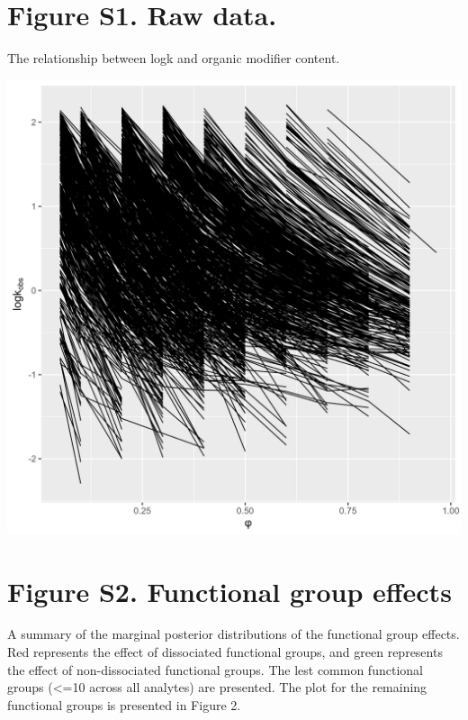 \documentclass[
]{article}
\begin{document}
\newpage{}

\hypertarget{figure-s1.-raw-data.}{%
\section{Figure S1. Raw data.}\label{figure-s1.-raw-data.}}

The relationship between logk and organic modifier content.

\includegraphics{../deliv/figures/manuscript/supplement/raw-data.png}

\newpage{}

\hypertarget{figure-s2.-functional-group-effects}{%
\section{Figure S2. Functional group
effects}\label{figure-s2.-functional-group-effects}}

A summary of the marginal posterior distributions of the functional
group effects. Red represents the effect of dissociated functional
groups, and green represents the effect of non-dissociated functional
groups. The lest common functional groups (\textless=10 across all
analytes) are presented. The plot for the remaining functional groups is
presented in Figure 2.
\end{document}

